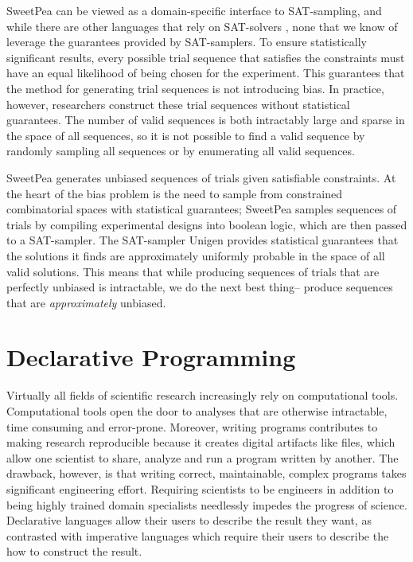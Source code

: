 SweetPea can be viewed as a domain-specific interface to SAT-sampling, and while there are other languages that rely on SAT-solvers \cite{torlak2014lightweight}, none that we know of leverage the guarantees provided by SAT-samplers. To ensure statistically significant results, every possible trial sequence that satisfies the constraints must have an equal likelihood of being chosen for the experiment. This guarantees that the method for generating trial sequences is not introducing bias. In practice, however, researchers construct these trial sequences without statistical guarantees. The number of valid sequences is both intractably large and sparse in the space of all sequences, so it is not possible to find a valid sequence by randomly sampling all sequences or by enumerating all valid sequences.

SweetPea generates unbiased sequences of trials given satisfiable constraints. At the heart of the bias problem is the need to sample from constrained combinatorial spaces with statistical guarantees; SweetPea samples sequences of trials by compiling experimental designs into boolean logic, which are then passed to a SAT-sampler. The SAT-sampler Unigen \cite{meel2016constrained}
provides statistical guarantees that the solutions it finds are approximately uniformly probable in the space of all valid solutions. This means that while producing sequences of trials that are perfectly unbiased is intractable, we do the next best thing-- produce sequences that are \emph{approximately} unbiased.

\section{Declarative Programming}

Virtually all fields of scientific research increasingly rely on computational tools. Computational tools open the door to analyses that are otherwise intractable, time consuming and error-prone. Moreover, writing programs contributes to making research reproducible because it creates digital artifacts like files, which allow one scientist to share, analyze and run a program written by another. The drawback, however, is that writing correct, maintainable, complex programs takes significant engineering effort. Requiring scientists to be engineers in addition to being highly trained domain specialists needlessly impedes the progress of science. Declarative languages allow their users to describe the result they want, as contrasted with imperative languages which require their users to describe the how to construct the result.

